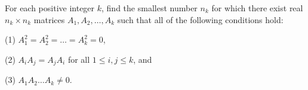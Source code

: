 For each positive integer $ k$, find the smallest number $ n_{k}$ for which there exist real $ n_{k}\times n_{k}$ matrices $ A_{1}, A_{2}, \ldots, A_{k}$ such that all of the following conditions hold:

(1) $ A_{1}^{2}= A_{2}^{2}= \ldots = A_{k}^{2}= 0$,

(2) $ A_{i}A_{j}= A_{j}A_{i}$ for all $ 1 \le i, j \le k$, and

(3) $ A_{1}A_{2}\ldots A_{k}\ne 0$.